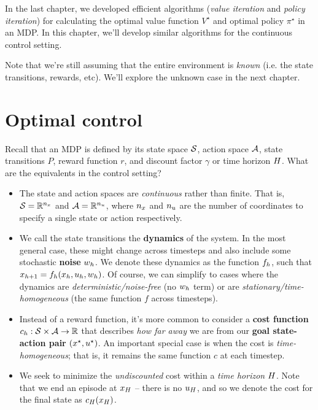 \documentclass[../main/main]{subfiles}
\begin{document}
In the last chapter, we developed efficient algorithms (\emph{value iteration} and \emph{policy iteration})
for calculating the optimal value function $V^\star$ and optimal policy $\pi^\star$ in an MDP.
In this chapter, we'll develop similar algorithms for the continuous control setting.

Note that we're still assuming that the entire environment is \emph{known} (i.e. the state transitions, rewards, etc). We'll explore the unknown case in the next chapter.

\section{Optimal control}

Recall that an MDP is defined by its state space $\S$, action space $\A$, state transitions $P$, reward function $r$, and discount factor $\gamma$ or time horizon $\hor$. What are the equivalents in the control setting?

\begin{itemize}
    \item The state and action spaces are \emph{continuous} rather than finite. That is, $\S = \R^{n_\st}$ and $\A = \R^{n_\act}$, where $n_\st$ and $n_\act$ are the number of coordinates to specify a single state or action respectively.
    \item We call the state transitions the \textbf{dynamics} of the system. In the most general case, these might change across timesteps and also include some stochastic \textbf{noise} $w_\hi$. We denote these dynamics as the function $f_\hi$, such that $\st_{\hi+1} = f_\hi(\st_\hi, \act_\hi, w_\hi)$. Of course, we can simplify to cases where the dynamics are \emph{deterministic/noise-free} (no $w_\hi$ term) or are \emph{stationary/time-homogeneous} (the same function $f$ across timesteps).
    \item Instead of a reward function, it's more common to consider a \textbf{cost function} $c_\hi: \S \times \A \to \R$ that describes \emph{how far away} we are from our \textbf{goal state-action pair} $(\st^\star, \act^\star)$. An important special case is when the cost is \emph{time-homogeneous}; that is, it remains the same function $c$ at each timestep.
    \item We seek to minimize the \emph{undiscounted} cost within a \emph{time horizon} $\hor$. Note that we end an episode at $\st_\hor$ -- there is no $\act_\hor$, and so we denote the cost for the final state as $c_\hor(\st_\hor)$.
\end{itemize}
\end{document}
